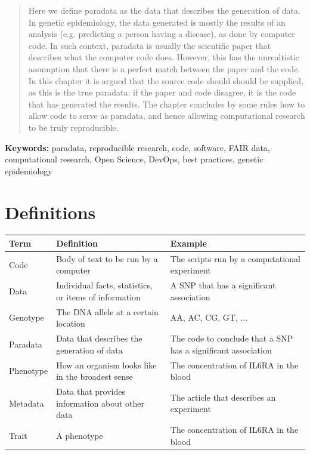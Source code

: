 \begin{abstract}

Here we define paradata as the data that describes the generation of data.
In genetic epidemiology, the data generated is mostly the results 
of an analysis (e.g. predicting a person having a disease),
as done by computer code.
In such context, paradata is usually the scientific paper that
describes what the computer code does.
However, this has the unrealtistic 
assumption that there is a perfect match between the paper and the code.
In this chapter it is argued that the source code should should be supplied,
as this is the true paradata: if the paper and code disagree, it is the
code that has generated the results.
The chapter concludes by some rules how to allow code to serve as paradata,
and hence allowing computational research to be truly reproducible.

\end{abstract}

{\bf Keywords:} paradata, reproducible research, code, software,
FAIR data, computational research, Open Science, DevOps, best practices,
genetic epidemiology

\section*{Definitions}

\begin{table}[h]
  \begin{tabular}{lll}
    Term      & Definition                                            & Example                                                         \\
    \hline
    Code      & Body of text to be run by a computer                  & The scripts run by a computational experiment                   \\
    Data      & Individual facts, statistics, or items of information & A SNP that has a significant association                        \\
    Genotype  & The DNA allele at a certain location                  & AA, AC, CG, GT, ...                                             \\
    Paradata  & Data that describes the generation of data            & The code to conclude that a SNP has a significant association   \\
    Phenotype & How an organism looks like in the broadest sense      & The concentration of IL6RA in the blood                         \\
    Metadata  & Data that provides information about other data       & The article that describes an experiment                        \\
    Trait     & A phenotype                                           & The concentration of IL6RA in the blood                         
  \end{tabular}
\end{table}

